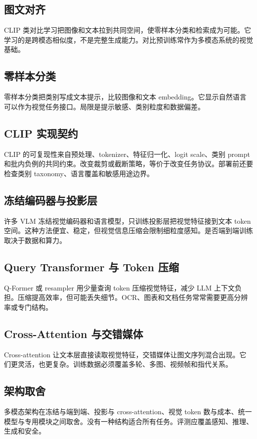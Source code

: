 \documentclass[UTF8,zihao=-4,openany]{ctexbook}
\begin{document}
\subsection{图文对齐}
CLIP 类对比学习把图像和文本拉到共同空间，使零样本分类和检索成为可能。它学习的是跨模态相似度，不是完整生成能力。对比预训练常作为多模态系统的视觉基础。

\subsection{零样本分类}
零样本分类把类别写成文本提示，比较图像和文本 embedding。它显示自然语言可以作为视觉任务接口。局限是提示敏感、类别粒度和数据偏差。

\subsection{CLIP 实现契约}
CLIP 的可复现性来自预处理、tokenizer、特征归一化、logit scale、类别 prompt 和批内负例的共同约束。改变裁剪或截断策略，等价于改变任务协议。部署前还要检查类别 taxonomy、语言覆盖和敏感用途边界。

\subsection{冻结编码器与投影层}
许多 VLM 冻结视觉编码器和语言模型，只训练投影层把视觉特征接到文本 token 空间。这种方法便宜、稳定，但视觉信息压缩会限制细粒度感知。是否端到端训练取决于数据和算力。

\subsection{Query Transformer 与 Token 压缩}
Q-Former 或 resampler 用少量查询 token 压缩视觉特征，减少 LLM 上下文负担。压缩提高效率，但可能丢失细节。OCR、图表和文档任务常常需要更高分辨率或专门结构。

\subsection{Cross-Attention 与交错媒体}
Cross-attention 让文本层直接读取视觉特征，交错媒体让图文序列混合出现。它们更灵活，也更复杂。训练数据必须覆盖多轮、多图、视频帧和指代关系。

\subsection{架构取舍}
多模态架构在冻结与端到端、投影与 cross-attention、视觉 token 数与成本、统一模型与专用模块之间取舍。没有一种结构适合所有任务。评测应覆盖感知、推理、生成和安全。
\end{document}
